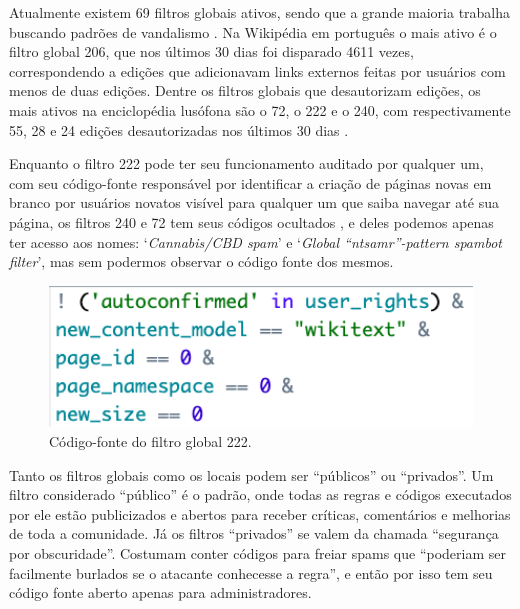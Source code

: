 
Atualmente existem 69 filtros globais ativos, sendo que a grande maioria trabalha buscando padrões de vandalismo . Na Wikipédia em português o mais ativo é o filtro global 206, que nos últimos 30 dias foi disparado 4611 vezes, correspondendo a edições que adicionavam links externos feitas por usuários com menos de duas edições.  Dentre os filtros globais que desautorizam edições, os mais ativos na enciclopédia lusófona são o 72, o 222 e o 240, com respectivamente 55, 28 e 24 edições desautorizadas nos últimos 30 dias .

Enquanto o filtro 222 pode ter seu funcionamento auditado por qualquer um, com seu código-fonte responsável por identificar a criação de páginas novas em branco por usuários novatos  visível para qualquer um que saiba navegar até sua página, os filtros 240 e 72 tem seus códigos ocultados , e deles podemos apenas ter acesso aos nomes: `\textit{Cannabis/CBD spam}' e `\textit{Global ``ntsamr''-pattern spambot filter}', mas sem podermos observar o código fonte dos mesmos.

\begin{figure}[H]
    \centering
    \includegraphics[width=1\textwidth]{Images/codigo_fonte_global_222.png}
    \caption{Código-fonte do filtro global 222. }
    \label{fig:codigo_fonte_global_222}
\end{figure}

Tanto os filtros globais como os locais podem ser ``públicos'' ou ``privados''. Um filtro considerado ``público'' é o padrão, onde todas as regras e códigos executados por ele estão publicizados e abertos para receber críticas, comentários e melhorias de toda a comunidade. Já os filtros ``privados'' se valem da chamada ``segurança por obscuridade''. Costumam conter códigos para freiar spams que ``poderiam ser facilmente burlados se o atacante conhecesse a regra'', e então por isso tem seu código fonte aberto apenas para administradores.


